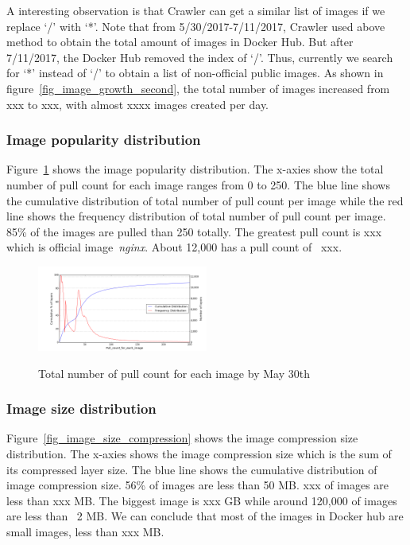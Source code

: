 A interesting observation is that Crawler can get a similar list of images if we replace `/' with `*'. Note that from 5/30/2017-7/11/2017, Crawler used above method to obtain the total amount of images in Docker Hub. But after 7/11/2017, the Docker Hub removed the index of `/'. Thus, currently we search for `*' instead of `/' to obtain a list of non-official public images. As shown in figure~\ref{fig_image_growth_second}, the total number of images increased from xxx to xxx, with almost xxxx images created per day.

\subsubsection{Image popularity distribution}


Figure~\ref{fig_pull_cnt_total} shows the image popularity distribution. The x-axies show the total number of pull count for each image ranges from 0 to 250. The blue line shows the cumulative distribution of total number of pull count per image while the red line shows the frequency distribution of total number of pull count per image. 85\% of the images are pulled than 250 totally. The greatest pull count is xxx which is official image~\textit{nginx}. About 12,000 has a pull count of ~xxx.

\begin{figure}
	\centering
	\includegraphics[width=0.5\textwidth]{graphs/2distributionPull_count_for_each_image.png}\\
	\caption{Total number of pull count for each image by May 30th}\label{fig_pull_cnt_total}
\end{figure}


\subsubsection{Image size distribution}

Figure~\ref{fig_image_size_compression} shows the image compression size distribution. The x-axies shows the image compression size which is the sum of its compressed layer size. The blue line shows the cumulative distribution of image compression size. 56\% of images are less than 50 MB. xxx of images are less than xxx MB. The biggest image is xxx GB while around 120,000 of images are less than ~2 MB. We can conclude that most of the images in Docker hub are small images, less than xxx MB.

